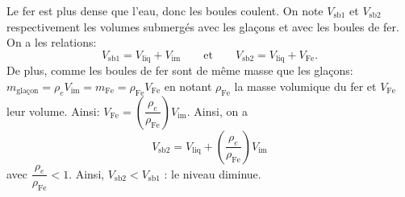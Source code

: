 \begin{corrige}
Le fer est plus dense que l'eau, donc les boules coulent. On note $V_{\text{sb1}}$ et $V_{\text{sb2}}$ respectivement les volumes submergés avec les glaçons et avec les boules de fer. On a
les relations:
\[
V_{\text{sb1}}  =V_{\text{liq}}+V_{\text{im}}\qquad\text{et}\qquad
V_{\text{sb2}}  =V_{\text{liq}}+V_{\text{Fe}}.
\]
De plus, comme les boules de fer sont de même masse que les glaçons:
$m_{\text{glaçon}}=\rho_{e}V_{\text{im}}=m_{\text{Fe}}=\rho_{\text{Fe}}V_{\text{Fe}}$
en notant $\rho_{\text{Fe}}$ la masse volumique du fer et $V_{\text{Fe}}$
leur volume. Ainsi: $V_{\text{Fe}}=\left(\dfrac{\rho_{e}}{\rho_{\text{Fe}}}\right)V_{\text{im}}$.
Ainsi, on a
\[
V_{\text{sb2}}=V_{\text{liq}}+\left(\dfrac{\rho_{e}}{\rho_{\text{Fe}}}\right)V_{\text{im}}
\]
avec $\dfrac{\rho_{e}}{\rho_{\text{Fe}}}<1$. Ainsi, $V_{\text{sb2}}<V_{\text{sb1}}$ : le niveau diminue.
\end{corrige}



\finEntrainement



\newpage







\hauteurLargeurCadreReponse		{7mm}{5cm}
\typeEntrainement				{} %
\initialisationEntrainement

